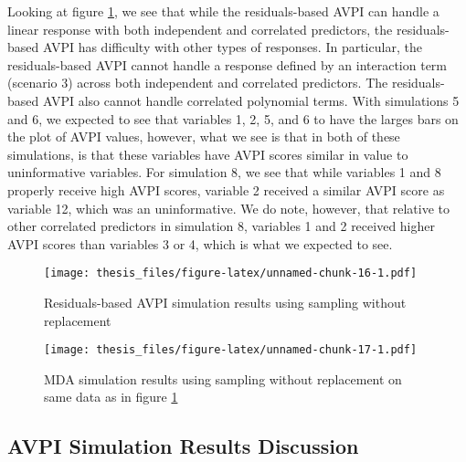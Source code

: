 \documentclass[12pt,twoside]{reedthesis}
\theoremstyle{definition}
\theoremstyle{definition}
\theoremstyle{definition}
\theoremstyle{remark}
\begin{document}
Looking at figure \ref{resAVPI}, we see that while the residuals-based
AVPI can handle a linear response with both independent and correlated
predictors, the residuals-based AVPI has difficulty with other types of
responses. In particular, the residuals-based AVPI cannot handle a
response defined by an interaction term (scenario 3) across both
independent and correlated predictors. The residuals-based AVPI also
cannot handle correlated polynomial terms. With simulations 5 and 6, we
expected to see that variables 1, 2, 5, and 6 to have the larges bars on
the plot of AVPI values, however, what we see is that in both of these
simulations, is that these variables have AVPI scores similar in value
to uninformative variables. For simulation 8, we see that while
variables 1 and 8 properly receive high AVPI scores, variable 2 received
a similar AVPI score as variable 12, which was an uninformative. We do
note, however, that relative to other correlated predictors in
simulation 8, variables 1 and 2 received higher AVPI scores than
variables 3 or 4, which is what we expected to see. \par
\begin{figure}
\centering
\texttt{[image: thesis\_files/figure-latex/unnamed-chunk-16-1.pdf]}
\caption{\label{fig:unnamed-chunk-16}\label{resAVPI}Residuals-based AVPI
simulation results using sampling without replacement}
\end{figure}
\begin{figure}
\centering
\texttt{[image: thesis\_files/figure-latex/unnamed-chunk-17-1.pdf]}
\caption{\label{fig:unnamed-chunk-17}\label{MDAwrep2}MDA simulation results
using sampling without replacement on same data as in figure
\ref{resAVPI}}
\end{figure}
\subsection{AVPI Simulation Results
Discussion}\label{avpi-simulation-results-discussion}
\end{document}

